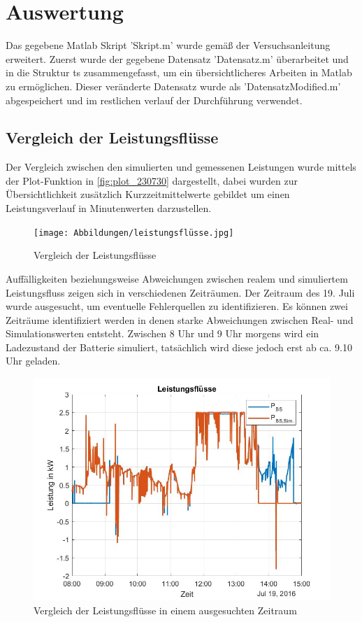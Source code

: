 \newpage
\section{Auswertung}
Das gegebene Matlab Skript 'Skript.m' wurde gemäß der Versuchsanleitung \cite[S. 11]{Laboranleitung} erweitert.
Zuerst wurde der gegebene Datensatz 'Datensatz.m' überarbeitet und in die Struktur ts zusammengefasst, um ein übersichtlicheres Arbeiten in Matlab zu ermöglichen.
Dieser veränderte Datensatz wurde als 'DatensatzModified.m' abgespeichert und im restlichen verlauf der Durchführung verwendet.

\subsection{Vergleich der Leistungsflüsse}
Der Vergleich zwischen den simulierten und gemessenen Leistungen wurde mittels der Plot-Funktion in \autoref{fig:plot_230730} dargestellt,
dabei wurden zur Übersichtlichkeit zusätzlich Kurzzeitmittelwerte gebildet um einen Leistungsverlauf in Minutenwerten darzustellen.

\begin{figure}[H]
    \centering
    \texttt{[image: Abbildungen/leistungsflüsse.jpg]}
    \caption{Vergleich der Leistungsflüsse}
    \label{fig:plot_230730}
\end{figure}


Auffälligkeiten beziehungsweise Abweichungen zwischen realem und simuliertem Leistungsfluss zeigen sich in verschiedenen Zeiträumen.
Der Zeitraum des 19. Juli wurde ausgesucht, um eventuelle Fehlerquellen zu identifizieren. Es können zwei Zeiträume identifiziert werden in denen starke Abweichungen zwischen Real- und Simulationswerten entsteht. Zwischen 8 Uhr und 9 Uhr morgens wird ein Ladezustand der Batterie simuliert, tatsächlich wird diese jedoch erst ab ca. 9.10 Uhr geladen.  


\begin{figure}[H]
    \centering
    \includegraphics[width=\textwidth]{Abbildungen/8.15.jpg}
    \caption{Vergleich der Leistungsflüsse in einem ausgesuchten Zeitraum}
    \label{fig:plot_230731}
\end{figure}


